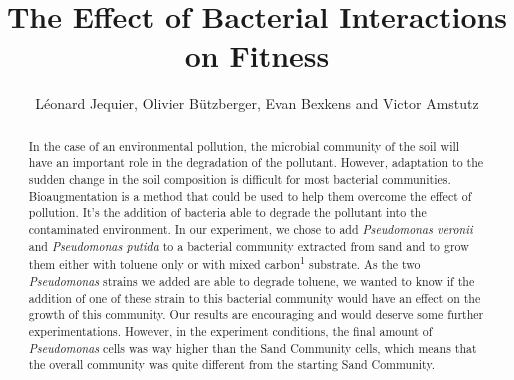 \documentclass[a4paper, 10pt, conference]{ieeeconf}   %
\title{\LARGE \bf
The Effect of Bacterial Interactions on Fitness
}
\author{Léonard Jequier, Olivier Bützberger, Evan Bexkens and Victor Amstutz%
}
\begin{document}
\vspace{-2cm}
\maketitle
\thispagestyle{plain}
\pagestyle{plain}

\begin{abstract}

	

In the case of an environmental pollution, the microbial community of the soil will have an important role in the degradation of the pollutant. However, adaptation to the sudden change in the soil composition is difficult for most bacterial communities. Bioaugmentation is a method that could be used to help them overcome the effect of pollution. It's the addition of bacteria able to degrade the pollutant into the contaminated environment. In our experiment, we chose to add \textit{Pseudomonas veronii} and \textit{Pseudomonas putida} to a bacterial community extracted from sand and to grow them either with toluene only or with mixed carbon\textsuperscript{1} substrate. As the two \textit{Pseudomonas} strains we added are able to degrade toluene, we wanted to know if the addition of one of these strain to this bacterial community would have an effect on the growth of this community.
Our results are encouraging and would deserve some further experimentations. However, in the experiment conditions, the final amount of \textit{Pseudomonas} cells was way higher than the Sand Community cells, which means that the overall community was quite different from the starting Sand Community.

\end{abstract}
\end{document}
